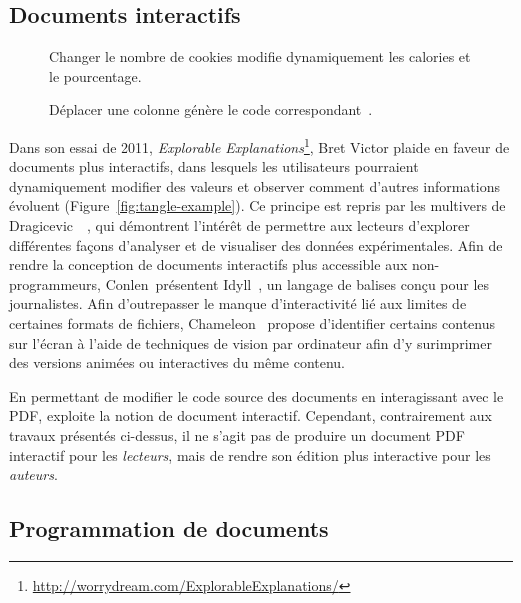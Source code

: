 \subsection{Documents interactifs}

\begin{wrapfigure}{r}{0.25\textwidth}
    \center
    \caption{Changer le nombre de cookies modifie dynamiquement les calories et le pourcentage.}
    \label{fig:tangle-example}
    \bigskip\bigskip
    \caption{Déplacer une colonne génère le code correspondant~\cite{kery2020future}.}
    \label{fig:interactive-dataframe-exemple}
\end{wrapfigure}

Dans son essai de 2011, \emph{Explorable Explanations}\footnote{\url{http://worrydream.com/ExplorableExplanations/}}, Bret Victor plaide en faveur de documents plus interactifs, dans lesquels les utilisateurs pourraient dynamiquement modifier des valeurs et observer comment d'autres informations évoluent (Figure~\ref{fig:tangle-example}).
Ce principe est repris par les multivers de Dragicevic~\etal~\cite{dragicevic2019increasing}, qui démontrent l'intérêt de permettre aux lecteurs d'explorer différentes façons d'analyser et de visualiser des données expérimentales.
Afin de rendre la conception de documents interactifs plus accessible aux non-programmeurs, Conlen~\etal présentent Idyll~\cite{conlen2018idyll}, un langage de balises conçu pour les journalistes.
Afin d'outrepasser le manque d'interactivité lié aux limites de certaines formats de fichiers, Chameleon~\cite{masson2020chameleon} propose d'identifier certains contenus sur l'écran à l'aide de techniques de vision par ordinateur afin d'y surimprimer des versions animées ou interactives du même contenu.

En permettant de modifier le code source des documents en interagissant avec le PDF, \iLaTeX{} exploite la notion de document interactif.
Cependant, contrairement aux travaux présentés ci-dessus, il ne s'agit pas de produire un document PDF interactif pour les \emph{lecteurs}, mais de rendre son édition plus interactive pour les \emph{auteurs}.



\subsection{Programmation de documents}

